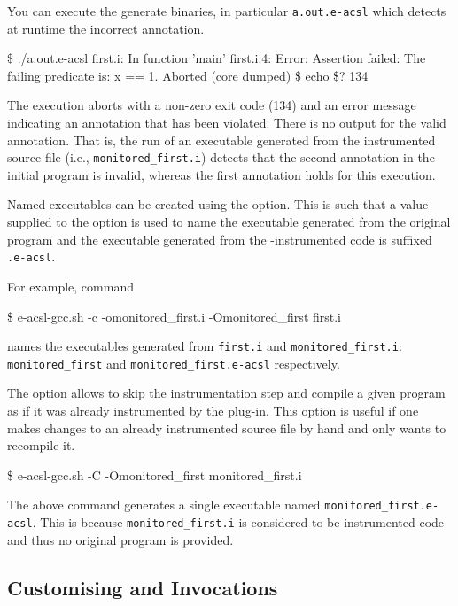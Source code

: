 You can execute the generate binaries, in particular \texttt{a.out.e-acsl} which
detects at runtime the incorrect annotation.
\begin{shell}
\$ ./a.out.e-acsl
first.i: In function 'main'
first.i:4: Error: Assertion failed:
        The failing predicate is:
        x == 1.
Aborted (core dumped)
\$ echo \$?
134
\end{shell}
The execution aborts with a non-zero exit code (134) and an error message
indicating an \eacsl annotation that has been violated. There is no output for
the valid \eacsl annotation. That is, the run of an executable generated from
the instrumented source file (i.e., \texttt{monitored\_first.i}) detects that
the second annotation in the initial program is invalid, whereas the first
annotation holds for this execution.

Named executables can be created using the  option.  This is such
that a value supplied to the  option is used to name the executable
generated from the original program and the executable generated from the
\eacsl-instrumented code is suffixed \texttt{.e-acsl}.

For example, command
\begin{shell}
\$ e-acsl-gcc.sh -c -omonitored_first.i -Omonitored_first first.i
\end{shell}
names the executables generated from \texttt{first.i} and
\texttt{monitored\_first.i}: \texttt{monitored\_first} and
\texttt{monitored\_first.e-acsl} respectively.

The \eacslgcc {} option allows to skip the instrumentation step and
compile a given program as if it was already instrumented by the \eacsl
plug-in.  This option is useful if one makes changes to an already
instrumented source file by hand and only wants to recompile it.

\begin{shell}
\$ e-acsl-gcc.sh -C -Omonitored_first monitored_first.i
\end{shell}

The above command generates a single executable named
\texttt{monitored\_first.e-acsl}. This is because \texttt{monitored\_first.i} is
considered to be instrumented code and thus no original program is provided.

\subsection{Customising \framac and \gcc Invocations}

